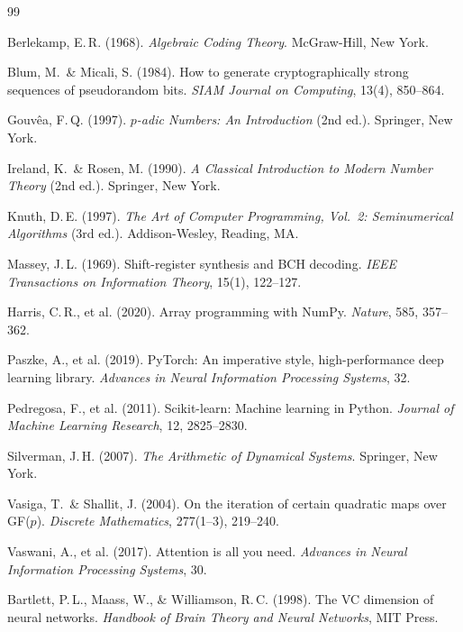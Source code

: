 \documentclass[11pt]{article}
\theoremstyle{plain}
\theoremstyle{definition}
\begin{document}
\begin{thebibliography}{99}

Berlekamp, E.\,R. (1968).
\textit{Algebraic Coding Theory}.
McGraw-Hill, New York.

Blum, M.\ \& Micali, S. (1984).
How to generate cryptographically strong sequences of pseudorandom bits.
\textit{SIAM Journal on Computing}, 13(4), 850--864.

Gouvêa, F.\,Q. (1997).
\textit{$p$-adic Numbers: An Introduction} (2nd ed.).
Springer, New York.

Ireland, K.\ \& Rosen, M. (1990).
\textit{A Classical Introduction to Modern Number Theory} (2nd ed.).
Springer, New York.

Knuth, D.\,E. (1997).
\textit{The Art of Computer Programming, Vol.\ 2: Seminumerical Algorithms} (3rd ed.).
Addison-Wesley, Reading, MA.

Massey, J.\,L. (1969).
Shift-register synthesis and BCH decoding.
\textit{IEEE Transactions on Information Theory}, 15(1), 122--127.

Harris, C.\,R., et al. (2020).
Array programming with NumPy.
\textit{Nature}, 585, 357--362.

Paszke, A., et al. (2019).
PyTorch: An imperative style, high-performance deep learning library.
\textit{Advances in Neural Information Processing Systems}, 32.

Pedregosa, F., et al. (2011).
Scikit-learn: Machine learning in Python.
\textit{Journal of Machine Learning Research}, 12, 2825--2830.

Silverman, J.\,H. (2007).
\textit{The Arithmetic of Dynamical Systems}.
Springer, New York.

Vasiga, T.\ \& Shallit, J. (2004).
On the iteration of certain quadratic maps over GF($p$).
\textit{Discrete Mathematics}, 277(1--3), 219--240.

Vaswani, A., et al. (2017).
Attention is all you need.
\textit{Advances in Neural Information Processing Systems}, 30.

Bartlett, P.\,L., Maass, W., \& Williamson, R.\,C. (1998).
The VC dimension of neural networks.
\textit{Handbook of Brain Theory and Neural Networks}, MIT Press.


\end{thebibliography}
\end{document}
